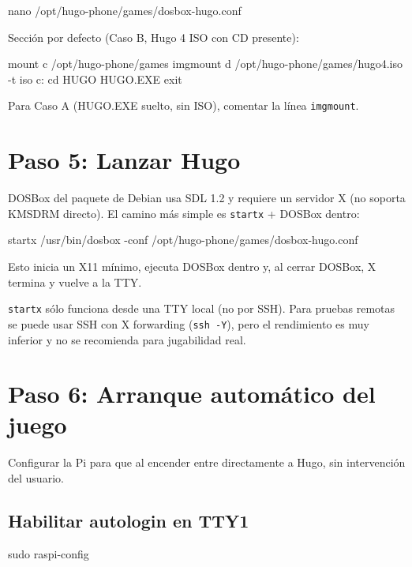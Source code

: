 \begin{nota}
\begin{shellcode}
nano /opt/hugo-phone/games/dosbox-hugo.conf
\end{shellcode}

Sección por defecto (Caso B, Hugo 4 ISO con CD presente):

\begin{plaincode}
[autoexec]
mount c /opt/hugo-phone/games
imgmount d /opt/hugo-phone/games/hugo4.iso -t iso
c:
cd HUGO
HUGO.EXE
exit
\end{plaincode}

Para Caso A (HUGO.EXE suelto, sin ISO), comentar la línea \texttt{imgmount}.

\section{Paso 5: Lanzar Hugo}

DOSBox del paquete de Debian usa SDL 1.2 y requiere un servidor X (no soporta KMSDRM directo). El camino más simple es \texttt{startx} + DOSBox dentro:

\begin{shellcode}
startx /usr/bin/dosbox -conf /opt/hugo-phone/games/dosbox-hugo.conf
\end{shellcode}

Esto inicia un X11 mínimo, ejecuta DOSBox dentro y, al cerrar DOSBox, X termina y vuelve a la TTY.

\begin{nota}
\texttt{startx} sólo funciona desde una TTY local (no por SSH). Para pruebas remotas se puede usar SSH con X forwarding (\texttt{ssh -Y}), pero el rendimiento es muy inferior y no se recomienda para jugabilidad real.
\end{nota}

\section{Paso 6: Arranque automático del juego}

Configurar la Pi para que al encender entre directamente a Hugo, sin intervención del usuario.

\subsection{Habilitar autologin en TTY1}

\begin{shellcode}
sudo raspi-config
\end{shellcode}


\end{nota}
